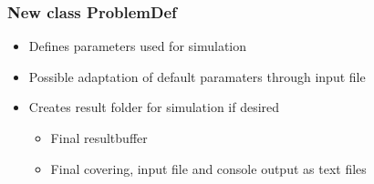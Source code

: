 \subsubsection{New class ProblemDef}
\begin{itemize}[noitemsep,topsep=0pt, partopsep=0pt]
\item Defines parameters used for simulation
\item Possible adaptation of default paramaters through input file
\item Creates result folder for simulation if desired
	\begin{itemize}[noitemsep,topsep=0pt, partopsep=0pt]
	\item Final resultbuffer
	\item Final covering, input file and console output as text files
	\end{itemize}
\end{itemize}

